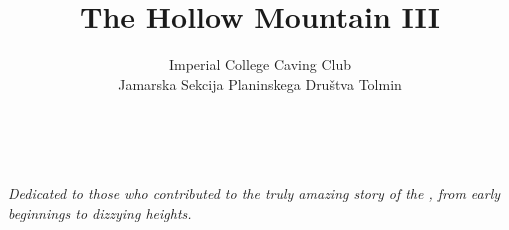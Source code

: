 \documentclass[symmetric, a4paper]{tufte-book}
\title{The Hollow Mountain III}
\author{Imperial College Caving Club \\Jamarska Sekcija Planinskega Dru\v{s}tva Tolmin }
\begin{document}
\frontmatter 
\maketitle %

\justify

\cleardoublepage
~\vfill
\begin{doublespace}
\noindent\fontsize{12}{14}\selectfont\sffamily\slshape
\nohyphenation
Dedicated to those who contributed to the truly amazing story of the , from early beginnings to dizzying heights.
\end{doublespace}
\vfill
\vfill




\newpage



	\tableofcontents %
	\mainmatter
	

	
  	
	
 	
	
	
	
\backmatter
	
	    \clearpage
        	
	
	
	
	\label{Bibliography}
	
	
	
	\listofsurveys
	\listofmaps
   	 \printindex
   	
    

    
\end{document}
